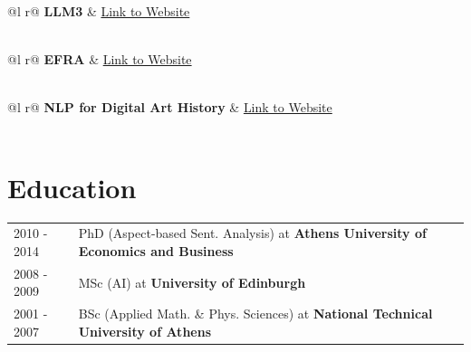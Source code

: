 \documentclass[a4paper,12pt]{article}
\begin{document}
\begin{tabularx}{\linewidth}{ @{}l r@{} }
\textbf{LLM3} & \hfill \href{https://sites.google.com/view/llm3}{Link to Website} \\[3.75pt]
  \\
\end{tabularx}

\begin{tabularx}{\linewidth}{ @{}l r@{} }
\textbf{EFRA} & \hfill \href{https://efraproject.eu/}{Link to Website} \\[3.75pt]
  \\
\end{tabularx}

\begin{tabularx}{\linewidth}{ @{}l r@{} }
\textbf{NLP for Digital Art History} & \hfill \href{https://www.su.se/english/research/research-projects/natural-language-processing-for-digital-art-history}{Link to Website} \\[3.75pt]
  \\
\end{tabularx}

\section{Education}
\begin{tabularx}{\linewidth}{@{}l X@{}}	
2010 - 2014 & PhD (Aspect-based Sent. Analysis) at \textbf{Athens University of Economics and Business} \\

2008 - 2009 & MSc (AI) at \textbf{University of Edinburgh} \\ 

2001 - 2007 & BSc (Applied Math. \& Phys. Sciences) at \textbf{National Technical University of Athens} \\
\end{tabularx}
\end{document}
